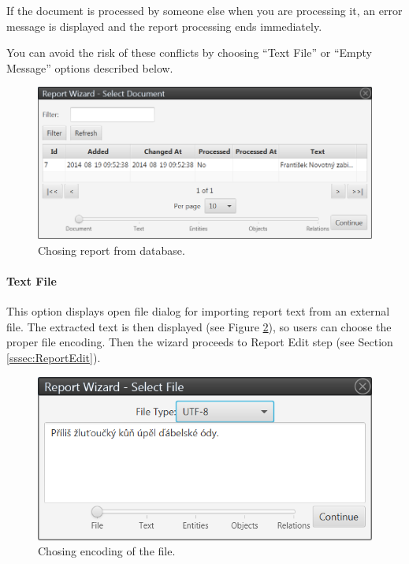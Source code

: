If the document is processed by someone else when you are processing it, an
error message is displayed and the report processing ends immediately.

You can avoid the risk of these conflicts by choosing ``Text File'' or ``Empty
Message'' options described below.

\begin{figure}[!htb]
        \centering
        \includegraphics[width=\textwidth]{Images/database}
        \caption{Chosing report from database.}
        \label{fig:Database}
\end{figure}

\paragraph{Text File} This option displays open file dialog for importing
report text from an external file. The extracted text is then displayed (see
Figure \ref{fig:TextFile}), so users can choose the proper file encoding. Then
the wizard proceeds to Report Edit step (see Section \ref{sssec:ReportEdit}).

\begin{figure}[!htb]
        \centering
        \includegraphics[width=\textwidth]{Images/textfile}
        \caption{Chosing encoding of the file.}
        \label{fig:TextFile}
\end{figure}

